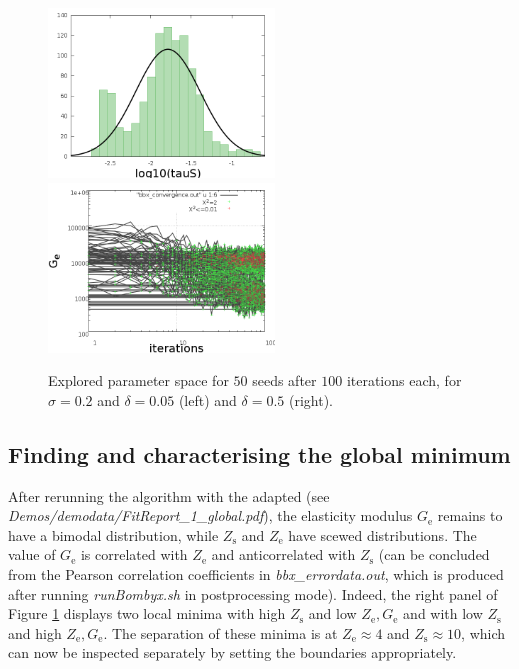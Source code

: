 \documentclass[  superscriptaddress]{revtex4}
\begin{document}
\begin{figure}
  \centering
  \includegraphics*[width=6cm]{../Demos/demodata/img/tauS_0p2_0p05.png}
  \includegraphics*[width=6cm]{../Demos/demodata/img/GE_0p2_0p05.png}
  \caption{Explored parameter space for $50$ seeds after $100$ iterations each, for $\sigma=0.2$ and $\delta=0.05$ (left) and $\delta=0.5$ (right).}
  \label{fig:delta0p4}
\end{figure}


\subsection{Finding and characterising the global minimum}

After rerunning the algorithm with the adapted (see \emph{Demos/demodata/FitReport\_1\_global.pdf}), the elasticity modulus $G_\mathrm{e}$ remains to have a bimodal distribution, while $Z_\mathrm{s}$ and $Z_\mathrm{e}$ have scewed distributions. The value of $G_\mathrm{e}$ is correlated with $Z_\mathrm{e}$ and anticorrelated with $Z_\mathrm{s}$ (can be concluded from the Pearson correlation coefficients in \emph{bbx\_errordata.out}, which is produced after running \emph{runBombyx.sh} in postprocessing mode).
Indeed, the right panel of Figure \ref{fig:delta0p4} displays two local minima with high $Z_\mathrm{s}$ and low $Z_\mathrm{e}, G_\mathrm{e}$ and with low $Z_\mathrm{s}$ and high $Z_\mathrm{e}, G_\mathrm{e}$.
The separation of these minima is at $Z_\mathrm{e}\approx 4$ and $Z_\mathrm{s}\approx 10$, which can now be inspected separately by setting the boundaries appropriately.
\end{document}
